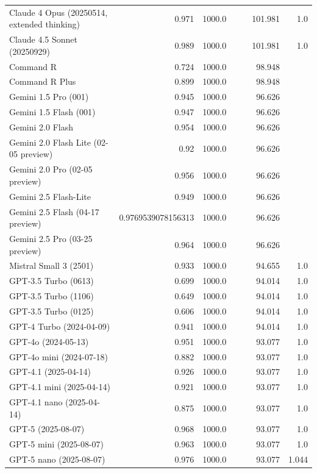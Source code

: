 \begin{table}[htp]
{\begin{tabular}{lrrrrrr}
Claude 4 Opus (20250514, extended thinking) & 0.971 & 1000.0 &  &  & 101.981 & 1.0 \\
Claude 4.5 Sonnet (20250929) & 0.989 & 1000.0 &  &  & 101.981 & 1.0 \\
Command R & 0.724 & 1000.0 &  &  & 98.948 &  \\
Command R Plus & 0.899 & 1000.0 &  &  & 98.948 &  \\
Gemini 1.5 Pro (001) & 0.945 & 1000.0 &  &  & 96.626 &  \\
Gemini 1.5 Flash (001) & 0.947 & 1000.0 &  &  & 96.626 &  \\
Gemini 2.0 Flash & 0.954 & 1000.0 &  &  & 96.626 &  \\
Gemini 2.0 Flash Lite (02-05 preview) & 0.92 & 1000.0 &  &  & 96.626 &  \\
Gemini 2.0 Pro (02-05 preview) & 0.956 & 1000.0 &  &  & 96.626 &  \\
Gemini 2.5 Flash-Lite & 0.949 & 1000.0 &  &  & 96.626 &  \\
Gemini 2.5 Flash (04-17 preview) & 0.9769539078156313 & 1000.0 &  &  & 96.626 &  \\
Gemini 2.5 Pro (03-25 preview) & 0.964 & 1000.0 &  &  & 96.626 &  \\
Mistral Small 3 (2501) & 0.933 & 1000.0 &  &  & 94.655 & 1.0 \\
GPT-3.5 Turbo (0613) & 0.699 & 1000.0 &  &  & 94.014 & 1.0 \\
GPT-3.5 Turbo (1106) & 0.649 & 1000.0 &  &  & 94.014 & 1.0 \\
GPT-3.5 Turbo (0125) & 0.606 & 1000.0 &  &  & 94.014 & 1.0 \\
GPT-4 Turbo (2024-04-09) & 0.941 & 1000.0 &  &  & 94.014 & 1.0 \\
GPT-4o (2024-05-13) & 0.951 & 1000.0 &  &  & 93.077 & 1.0 \\
GPT-4o mini (2024-07-18) & 0.882 & 1000.0 &  &  & 93.077 & 1.0 \\
GPT-4.1 (2025-04-14) & 0.926 & 1000.0 &  &  & 93.077 & 1.0 \\
GPT-4.1 mini (2025-04-14) & 0.921 & 1000.0 &  &  & 93.077 & 1.0 \\
GPT-4.1 nano (2025-04-14) & 0.875 & 1000.0 &  &  & 93.077 & 1.0 \\
GPT-5 (2025-08-07) & 0.968 & 1000.0 &  &  & 93.077 & 1.0 \\
GPT-5 mini (2025-08-07) & 0.963 & 1000.0 &  &  & 93.077 & 1.0 \\
GPT-5 nano (2025-08-07) & 0.976 & 1000.0 &  &  & 93.077 & 1.044 \\

\end{tabular}}
\end{table}
